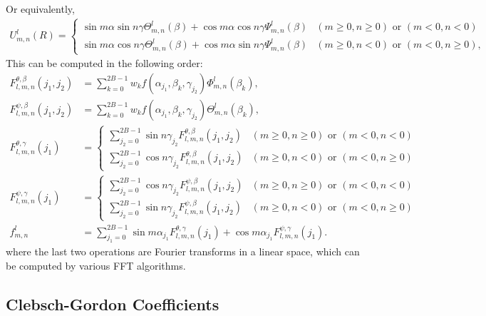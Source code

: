 \documentclass[onecolumn,11pt]{IEEEtran}
\begin{document}
Or equivalently,
\begin{align*}
    U^l_{m,n} (R) =
    \begin{cases}
        \sin m\alpha \sin n\gamma \Theta^l_{m,n} (\beta) + \cos m\alpha \cos n\gamma \Psi^l_{m,n}(\beta) & (m\geq 0, n\geq 0) \text{ or } (m<0,n<0)\\
        \sin m\alpha \cos n\gamma \Theta^l_{m,n} (\beta) + \cos m\alpha \sin n\gamma \Psi^l_{m,n}(\beta) & (m\geq 0, n < 0) \text{ or } (m<0,n\geq0),
    \end{cases}
\end{align*}
This can be computed in the following order:
\begin{align*}
    F^{\theta,\beta}_{l,m,n}(j_1,j_2) &= \sum_{k=0}^{2B-1}w_k f(\alpha_{j_1},\beta_k,\gamma_{j_2})\Phi^l_{m,n}(\beta_k),\\
    F^{\psi,\beta}_{l,m,n}(j_1,j_2) &= \sum_{k=0}^{2B-1}w_k f(\alpha_{j_1},\beta_k,\gamma_{j_2}) \Theta^l_{m,n}(\beta_k),\\
F^{\theta,\gamma}_{l,m,n}(j_1)&=
\begin{cases}
    \sum_{j_2=0}^{2B-1} \sin n\gamma_{j_2} F^{\theta,\beta}_{l,m,n}(j_1,j_2) & (m\geq 0,n\geq 0) \text{ or } (m<0,n<0)\\
    \sum_{j_2=0}^{2B-1} \cos n\gamma_{j_2} F^{\theta,\beta}_{l,m,n}(j_1,j_2) & (m\geq 0, n<0) \text{ or } (m<0,n\geq 0)
\end{cases}\\
F^{\psi,\gamma}_{l,m,n}(j_1)&=
\begin{cases}
    \sum_{j_2=0}^{2B-1} \cos n\gamma_{j_2} F^{\psi,\beta}_{l,m,n}(j_1,j_2) & (m\geq 0,n\geq 0) \text{ or } (m<0,n<0)\\
    \sum_{j_2=0}^{2B-1} \sin n\gamma_{j_2} F^{\psi,\beta}_{l,m,n}(j_1,j_2) & (m\geq 0, n<0) \text{ or } (m<0,n\geq 0)
\end{cases}\\
f^l_{m,n} & = \sum_{j_1=0}^{2B-1} \sin m\alpha_{j_1} F^{\theta,\gamma}_{l,m,n}(j_1) + \cos m\alpha_{j_1} F^{\psi,\gamma}_{l,m,n}(j_1).
\end{align*}
where the last two operations are Fourier transforms in a linear space, which can be computed by various FFT algorithms. 

\subsection{Clebsch-Gordon Coefficients}
\end{document}
